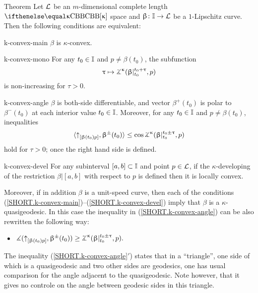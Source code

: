 \begin{thm}{Theorem}\label{thm:defs.of.k-convex.curve}
Let $\mathcal{L}$  be an $m$-dimensional complete length $\Alex{\kappa}$ space
and
$\beta\:\II\to \spc{L}$ be a $1$-Lipschitz curve.
Then the following conditions are equivalent:

\begin{subthm}{k-convex-main} $\beta$ is $\kappa$-convex. 
\end{subthm}


\begin{subthm}{k-convex-mono} For any $t_0\in\II$ and $p\not=\beta(t_0)$, 
the subfunction
\[\tau \mapsto\tangle\mc\kappa(\beta|_{t_0}^{t_0+\tau},p)\]
is non-increasing for $\tau>0$.
\end{subthm}

\begin{subthm}{k-convex-angle} $\beta$ is both-side differentiable, and vector $\beta^+(t_0)$ is polar to $\beta^-(t_0)$ at each interior value $t_0\in \II$.
Moreover, for any $t_0\in\II$ and $p\not=\beta(t_0)$, inequalities
\[\<\dir{\beta(t_0)}p,\beta^\pm(t_0)\>
\le 
\cos\tangle\mc\kappa(\beta|_{t_0}^{t_0\pm\tau}, p)\] 
hold for $\tau>0$; once the right hand side is defined.
\end{subthm}

\begin{subthm}{k-convex-devel} For any subinterval $[a,b]\subset\II$ and point $p\in \spc{L}$,
if the $\kappa$-developing of the restriction $\beta|[a,b]$
with respect to $p$ is defined then it is locally convex.
\end{subthm}

Moreover, if in addition $\beta$ is a unit-speed curve, then each of the conditions  (\ref{SHORT.k-convex-main})--(\ref{SHORT.k-convex-devel}) imply that $\beta$ is a $\kappa$-quasigeodesic.
In this case the inequality in (\ref{SHORT.k-convex-angle}) can be also rewritten the following way:
\begin{itemize}
 \item[\textit{\ref{SHORT.k-convex-angle}$'$)}] $\mangle(\dir{\beta(t_0)}p,\beta^\pm(t_0))
\ge \tangle\mc\kappa(\beta|_{t_0}^{t_0\pm\tau}, p).$
\end{itemize}



\end{thm}

The inequality (\ref{SHORT.k-convex-angle}$'$) states that in a ``triangle'', one side of which is a quasigeodesic and two other sides are geodesics, one has usual comparison for the angle adjacent to the quasigeodesic.
Note however, that it gives no controle on the angle between geodesic sides in this triangle.

